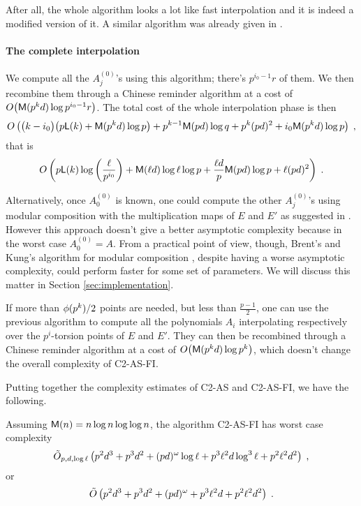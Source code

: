 After all, the whole algorithm looks a lot like fast interpolation
\cite[$\S$10]{vzGG} and it is indeed a modified version of it. A
similar algorithm was already given in \cite{EnMo03}.


\paragraph{The complete interpolation}
We compute all the $A_j^{(0)}$'s using this algorithm; there's
$p^{i_0-1}r$ of them. We then recombine them through a Chinese
reminder algorithm at a cost of $O\bigl(\mathrm{\sf M}(p^kd)\log
p^{i_0-1}r\bigr)$. The total cost of the whole interpolation phase is
then
\begin{equation*}
  O\left(\bigl(k-i_0\bigr) \bigl(p{\sf L}(k) + \mathrm{\sf M}(p^kd)\log p\bigr) +
    p^{k-1}\mathrm{\sf M}(pd)\log q + p^k(pd)^2 + i_0\mathrm{\sf M}(p^kd)\log p
  \right)
  \;\text{,}
\end{equation*}
that is
\begin{equation}
  \label{eq:interp}
  O\left(p{\sf L}(k)\log\left(\frac{\ell}{p^{i_0}}\right) + 
    \mathrm{\sf M}(\ell d)\log\ell\log p +
    \frac{\ell d}{p}\mathrm{\sf M}(pd)\log p +
    \ell(pd)^2
  \right)
  \;\text{.}
\end{equation}

Alternatively, once $A_0^{(0)}$ is known, one could compute the other
$A_j^{(0)}$'s using modular composition with the multiplication maps
of $E$ and $E'$ as suggested in \cite{Cou96}. However this approach
doesn't give a better asymptotic complexity because in the worst case
$A_0^{(0)}=A$. From a practical point of view, though, Brent's and
Kung's algorithm for modular composition \cite{BrKu78}, despite having
a worse asymptotic complexity, could perform faster for some set of
parameters. We will discuss this matter in Section
\ref{sec:implementation}.

If more than $\phi(p^k)/2$ points are needed, but less than
$\frac{p-1}{2}$, one can use the previous algorithm to compute all the
polynomials $A_i$ interpolating respectively over the $p^i$-torsion
points of $E$ and $E'$. They can then be recombined through a Chinese
reminder algorithm at a cost of $O\bigl(\mathrm{\sf M}(p^kd)\log p^k\bigr)$,
which doesn't change the overall complexity of C2-AS-FI.


Putting together the complexity estimates of C2-AS and C2-AS-FI, we
have the following.

\begin{theorem}
  \label{th:complexity}
  Assuming $\mathrm{\sf M}(n) = n\log n\log\log n$, the algorithm C2-AS-FI has
  worst case complexity
  \begin{equation*}
    \tilde{O}_{p,d,\log\ell}\left(
      p^2d^3 +
      p^3d^2 +
      (pd)^\omega\log\ell +
      p^3\ell^2 d\log^3\ell + 
      p^2\ell^2 d^2
    \right)
    \;\text{,}
  \end{equation*}
  or
  \begin{equation*}
    \tilde{O}\left(
      p^2d^3 +
      p^3d^2 +
      (pd)^\omega +
      p^3\ell^2 d + 
      p^2\ell^2 d^2
    \right)
    \;\text{.}
  \end{equation*}
\end{theorem}



